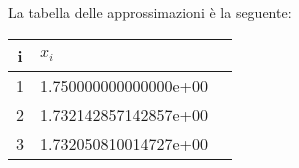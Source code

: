 

La tabella delle approssimazioni è la seguente:
\begin{center}
\begin{tabular}{c|lc}
i & \( x_i \) \\
\hline
1 & 1.750000000000000e+00 \\
2 & 1.732142857142857e+00 \\
3 & 1.732050810014727e+00 \\
\end{tabular}\\
\end{center}
